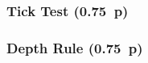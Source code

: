 





\subsubsection{Tick Test (0.75~p)}\label{sec:tick-test}




\subsubsection{Depth Rule (0.75~p)}\label{sec:depth-rule}






